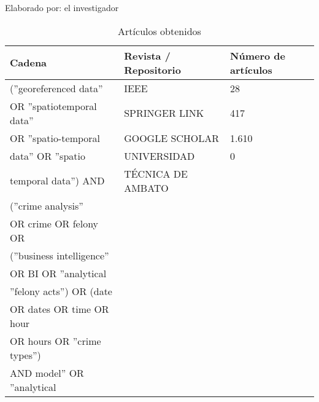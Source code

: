 \begin{ThreePartTable}
    \begin{TableNotes}[flushleft]
        \centering
        \item Elaborado por: el investigador
    \end{TableNotes}
    \begin{longtable}{|l|l|l|}
        \caption{Artículos obtenidos}
        \label{table:articulosobtenidos}                                                                  \\
        \hline
        \textbf{Cadena}                   & \textbf{Revista / Repositorio} & \textbf{Número de artículos} \\
        \hline
        (''georeferenced data''           & IEEE                           & 28                           \\ \cline{2-3}
        OR ''spatiotemporal data''        & SPRINGER LINK                  & 417                          \\ \cline{2-3}
        OR ''spatio-temporal              & GOOGLE SCHOLAR                 & 1.610                        \\ \cline{2-3}
        data'' OR ''spatio                & UNIVERSIDAD                    & 0                            \\
        temporal data'') AND              & TÉCNICA DE AMBATO              &                              \\ \cline{2-3}
        (''crime analysis''               &                                &                              \\
        OR crime OR felony OR             &                                &                              \\
        (''business intelligence''        &                                &                              \\
        OR BI OR ''analytical             &                                &                              \\
        ''felony acts'') OR (date         &                                &                              \\
        OR dates OR time OR  hour         &                                &                              \\
        OR hours OR ''crime types'')      &                                &                              \\
        AND  model'' OR ''analytical      &                                &                              \\

\end{longtable}
\end{ThreePartTable}
